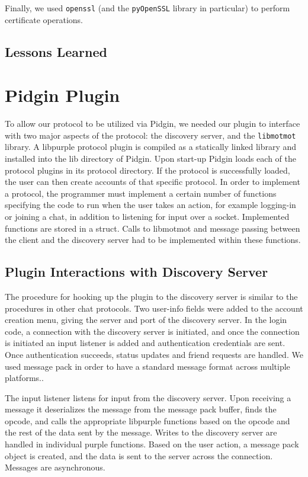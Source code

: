 \documentclass{sig-alternate}
\newcommand\libmotmot{\texttt{libmotmot}\xspace}
\begin{document}
Finally, we used \texttt{openssl} (and the \texttt{pyOpenSSL} library in
particular) to perform certificate operations.

\subsection{Lessons Learned}


\section{Pidgin Plugin}

To allow our protocol to be utilized via Pidgin, we needed our plugin to
interface with two major aspects of the protocol: the discovery server, and the
\libmotmot library.
A libpurple protocol plugin is compiled as a statically linked library and installed into the lib directory
of Pidgin. Upon start-up Pidgin loads each of the protocol plugins in its protocol directory. If the protocol is successfully loaded, the user
can then create accounts of that specific protocol.
In order to implement a protocol, the programmer must implement a certain number of functions specifying the code to run when the user takes
an action, for example logging-in or joining a chat, in addition to listening
for input over a socket. Implemented functions are stored in a struct. Calls to libmotmot and message passing between the client and the discovery server had to be
implemented within these functions.

\subsection{Plugin Interactions with Discovery Server}
The procedure for hooking up the plugin to the discovery server is similar to the procedures in other chat protocols. Two user-info fields were
added to the account creation menu, giving the server and port of the discovery server. In the login code, a connection with the discovery server
is initiated, and once the connection is initiated an input listener is added and authentication credentials are sent. Once authentication succeeds,
status updates and friend requests are handled. We used message pack in order to have a standard message format across multiple platforms..

The input listener listens for input from the discovery server. Upon receiving a message it deserializes the message from the message pack buffer, finds
the opcode, and calls the appropriate libpurple functions based on the opcode and the rest of the data sent by the message. Writes to the discovery server
are handled in individual purple functions. Based on the user action, a message pack object is created, and the data is sent to the server across
the connection. Messages are asynchronous.
\end{document}
